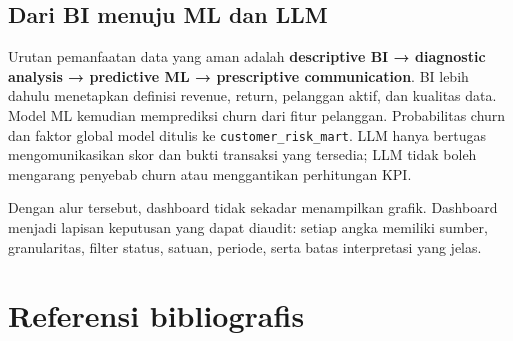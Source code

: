\documentclass[
  indonesian,
  letterpaper,
  DIV=11,
  numbers=noendperiod]{scrreprt}
\begin{document}
\subsection*{Dari BI menuju ML dan LLM}\label{dari-bi-menuju-ml-dan-llm}

Urutan pemanfaatan data yang aman adalah \textbf{descriptive BI →
diagnostic analysis → predictive ML → prescriptive communication}. BI
lebih dahulu menetapkan definisi revenue, return, pelanggan aktif, dan
kualitas data. Model ML kemudian memprediksi churn dari fitur pelanggan.
Probabilitas churn dan faktor global model ditulis ke
\texttt{customer\_risk\_mart}. LLM hanya bertugas mengomunikasikan skor
dan bukti transaksi yang tersedia; LLM tidak boleh mengarang penyebab
churn atau menggantikan perhitungan KPI.

Dengan alur tersebut, dashboard tidak sekadar menampilkan grafik.
Dashboard menjadi lapisan keputusan yang dapat diaudit: setiap angka
memiliki sumber, granularitas, filter status, satuan, periode, serta
batas interpretasi yang jelas.

\section*{Referensi bibliografis}\label{referensi-bibliografis}


\protect{}\label{refs}
\end{document}
